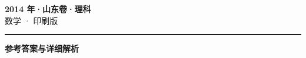 \documentclass[zihao=5, a4paper]{ctexart}
\begin{document}
\begin{center}
  {\Large\bfseries 2014 年·山东卷·理科}\\[4pt]
  {\large 数学 · 印刷版}
\end{center}
\medskip
{}

\par\bigskip\hrule\bigskip
{}
\Needspace{0.55\textheight}
\begin{center}{\large\bfseries 参考答案与详细解析}\end{center}
\smallskip

\end{document}
